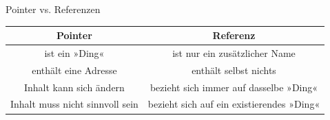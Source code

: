 \begin{frame}[fragile]{Pointer vs. Referenzen}
	\footnotesize
	\begin{tabular}{c|c}
		Pointer & Referenz \\ \hline
		ist ein »Ding« & ist nur ein zusätzlicher Name \\
		enthält eine Adresse & enthält selbst nichts \\
		Inhalt kann sich ändern & bezieht sich immer auf dasselbe »Ding« \\
		Inhalt muss nicht sinnvoll sein & bezieht sich auf ein existierendes »Ding« \\
	\end{tabular}
	
	\pause
	
	{\footnotesize
	\begin{block}{}
		
	\end{block}
	}
\end{frame}
